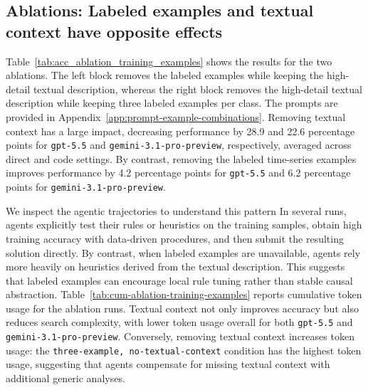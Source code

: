 \subsection{Ablations: Labeled examples and textual context have opposite effects}
Table~\ref{tab:acc_ablation_training_examples} shows the results for the two ablations.
The left block removes the labeled examples while keeping the high-detail textual description, whereas the right block removes the high-detail textual description while keeping three labeled examples per class.
The prompts are provided in Appendix~\ref{app:prompt-example-combinations}.
Removing textual context has a large impact, decreasing performance by 28.9 and 22.6 percentage points for \texttt{gpt-5.5} and \texttt{gemini-3.1-pro-preview}, respectively, averaged across direct and code settings.
By contrast, removing the labeled time-series examples improves performance by 4.2 percentage points for \texttt{gpt-5.5} and 6.2 percentage points for \texttt{gemini-3.1-pro-preview}.


\begin{table}[ht]
\centering
\caption{Top-1 accuracy for the two ablation studies, aggregated across environments. Noise is set to \texttt{high}.}
\label{tab:acc_ablation_training_examples}

\end{table}

\FloatBarrier


\begin{table}[ht]
\centering
\caption{Cumulative token usage for the two ablation studies, aggregated across environments and reported in millions of tokens.}
\label{tab:cum-ablation-training-examples}

\end{table}


We inspect the agentic trajectories to understand this pattern
In several runs, agents explicitly test their rules or heuristics on the training samples, obtain high training accuracy with data-driven procedures, and then submit the resulting solution directly.
By contrast, when labeled examples are unavailable, agents rely more heavily on heuristics derived from the textual description.
This suggests that labeled examples can encourage local rule tuning rather than stable causal abstraction.
Table~\ref{tab:cum-ablation-training-examples} reports cumulative token usage for the ablation runs.
Textual context not only improves accuracy but also reduces search complexity, with lower token usage overall for both \texttt{gpt-5.5} and \texttt{gemini-3.1-pro-preview}.
Conversely, removing textual context increases token usage: the \texttt{three-example, no-textual-context} condition has the highest token usage, suggesting that agents compensate for missing textual context with additional generic analyses.


